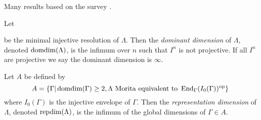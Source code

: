 
Many results based on the survey \cite{Opp09}.

\begin{defn}
	Let 
	\begin{center}
	\end{center}
	be the minimal injective resolution of $\Lambda$. Then the \emph{dominant dimension} of $\Lambda$, denoted $\operatorname{domdim}(\Lambda)$, is the infimum over $n$ such that $I^n$ is not projective. If all $I^n$ are projective we say the dominant dimension is $\infty$.
\end{defn}

\begin{defn}
	Let $A$ be defined by $$A = \{\Gamma | \operatorname{domdim}(\Gamma) \geq 2, \Lambda \text{ Morita equivalent to } \operatorname{End}_\Gamma(I_0(\Gamma))^{\operatorname{op}}\}$$ where $I_0(\Gamma)$ is the injective envelope of $\Gamma$. Then the \emph{representation dimension} of $\Lambda$, denoted $\operatorname{repdim}(\Lambda)$, is the infimum of the global dimensions of $\Gamma \in A$.
\end{defn}

